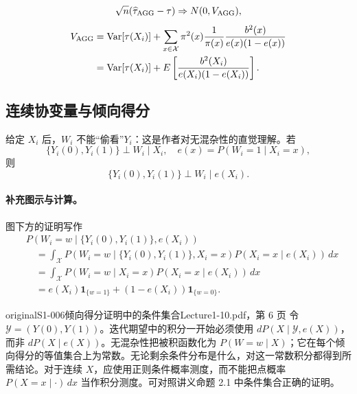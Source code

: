 \[
\sqrt n(\widehat\tau_{\rm AGG}-\tau)\Rightarrow N(0,V_{\rm AGG}),
\]
\begin{align*}
V_{\rm AGG}&=\operatorname{Var}[\tau(X_i)]
+\sum_{x\in\mathcal X}\pi^2(x)\frac1{\pi(x)}
\frac{b^2(x)}{e(x)(1-e(x))}\\
&=\operatorname{Var}[\tau(X_i)]
+E\left[\frac{b^2(X_i)}{e(X_i)(1-e(X_i))}\right].
\end{align*}
\subsection{连续协变量与倾向得分}
给定 $X_i$ 后，$W_i$ 不能“偷看”$Y_i$：这是作者对无混杂性的直觉理解。若
\[
\{Y_i(0),Y_i(1)\}\perp W_i\mid X_i,
\quad e(x)=P(W_i=1\mid X_i=x),
\]
则
\[
\{Y_i(0),Y_i(1)\}\perp W_i\mid e(X_i).
\]
\paragraph{补充图示与计算。}
\begin{center}
\end{center}
图下方的证明写作
\begin{align*}
&P(W_i=w\mid\{Y_i(0),Y_i(1)\},e(X_i))\\
&\quad=\int_{\mathcal X}P(W_i=w\mid\{Y_i(0),Y_i(1)\},X_i=x)
 P(X_i=x\mid e(X_i))\,dx\\
&\quad=\int_{\mathcal X}P(W_i=w\mid X_i=x)P(X_i=x\mid e(X_i))\,dx\\
&\quad=e(X_i)\mathbf1_{\{w=1\}}+(1-e(X_i))\mathbf1_{\{w=0\}}.
\end{align*}
\begin{reviewnote}{original}{S1-006}{倾向得分证明中的条件集合}{Lecture1-10.pdf，第 6 页}
令 $\mathcal Y=(Y(0),Y(1))$。迭代期望中的积分一开始必须使用 $dP(X\mid\mathcal Y,e(X))$，而非 $dP(X\mid e(X))$。无混杂性把被积函数化为 $P(W=w\mid X)$；它在每个倾向得分的等值集合上为常数。无论剩余条件分布是什么，对这一常数积分都得到所需结论。对于连续 $X$，应使用正则条件概率测度，而不能把点概率 $P(X=x\mid\cdot)\,dx$ 当作积分测度。可对照讲义命题 2.1 中条件集合正确的证明。
\end{reviewnote}


